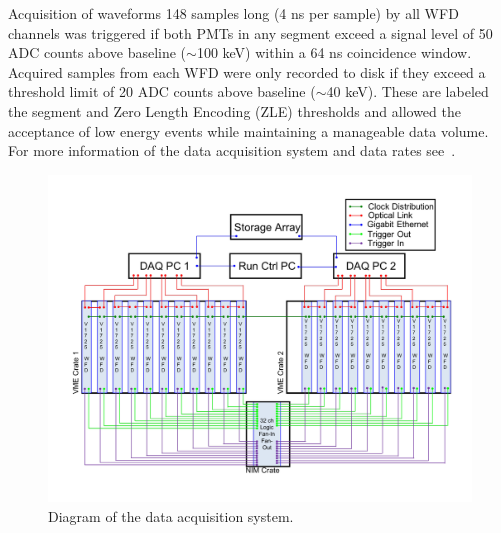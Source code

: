 Acquisition of waveforms 148 samples long (4 ns per sample) by all WFD channels was triggered if both PMTs in any segment exceed a signal level of 50 ADC counts above baseline ($\sim$100 keV) within a 64 ns coincidence window.  
Acquired samples from each WFD were only recorded to disk if they exceed a threshold limit of 20 ADC counts above baseline ($\sim$40 keV). 
These are labeled the segment and Zero Length Encoding (ZLE) thresholds and allowed the acceptance of low energy events while maintaining a manageable data volume. 
For more information of the data acquisition system and data rates see~\cite{LongNIM}.

\begin{figure}[h]
	\centering
	\includegraphics[width=0.9\linewidth]{tex/4-prospect-images/DAQ}
	\caption{Diagram of the data acquisition system.}
	\label{fig:daq}
\end{figure}


